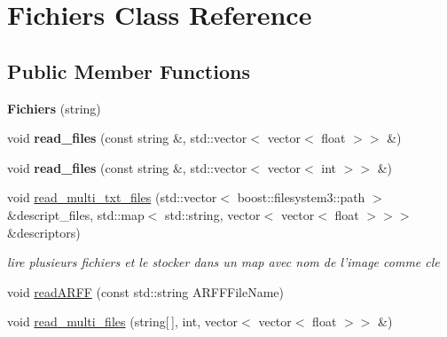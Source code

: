 \hypertarget{class_fichiers}{
\section{Fichiers Class Reference}
\label{class_fichiers}
}
\subsection*{Public Member Functions}
\begin{DoxyCompactItemize}
\item 
\hypertarget{class_fichiers_a842f4a818ca34a8a9e972419e4c31248}{
{\bfseries Fichiers} (string)}
\label{class_fichiers_a842f4a818ca34a8a9e972419e4c31248}

\item 
\hypertarget{class_fichiers_ae5c93af14e9a0b5b2179acb3b684887f}{
void {\bfseries read\_\-files} (const string \&, std::vector$<$ vector$<$ float $>$$>$ \&)}
\label{class_fichiers_ae5c93af14e9a0b5b2179acb3b684887f}

\item 
\hypertarget{class_fichiers_ae4a7f2381c7ae91c81e78370d90278f2}{
void {\bfseries read\_\-files} (const string \&, std::vector$<$ vector$<$ int $>$$>$ \&)}
\label{class_fichiers_ae4a7f2381c7ae91c81e78370d90278f2}

\item 
\hypertarget{class_fichiers_a5d3cbf5c89889cb41595f722e20a5f37}{
void \hyperlink{class_fichiers_a5d3cbf5c89889cb41595f722e20a5f37}{read\_\-multi\_\-txt\_\-files} (std::vector$<$ boost::filesystem3::path $>$ \&descript\_\-files, std::map$<$ std::string, vector$<$ vector$<$ float $>$$>$$>$ \&descriptors)}
\label{class_fichiers_a5d3cbf5c89889cb41595f722e20a5f37}

\begin{DoxyCompactList}\small\item\em lire plusieurs fichiers et le stocker dans un map avec nom de l'image comme cle \end{DoxyCompactList}\item 
void \hyperlink{class_fichiers_af633fe0c7e3ab9ad9bdcbcfa59711ebc}{readARFF} (const std::string ARFFFileName)
\item 
\hypertarget{class_fichiers_a84ed1a06c9d9c9af821ae09ecfd87756}{
void \hyperlink{class_fichiers_a84ed1a06c9d9c9af821ae09ecfd87756}{read\_\-multi\_\-files} (string\mbox{[}$\,$\mbox{]}, int, vector$<$ vector$<$ float $>$$>$ \&)}
\label{class_fichiers_a84ed1a06c9d9c9af821ae09ecfd87756}


\end{DoxyCompactItemize}
